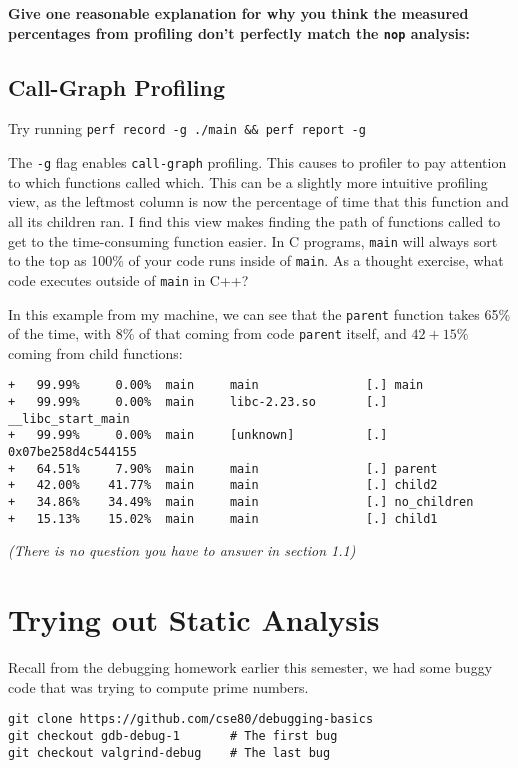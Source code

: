 \documentclass{article}
\begin{document}
\textbf{Give one reasonable explanation for why you think the measured
  percentages from profiling don't perfectly match the \texttt{nop} analysis:}
\vfill


\subsection{Call-Graph Profiling}
Try running \texttt{perf record -g ./main \&\& perf report -g}

The \texttt{-g} flag enables \texttt{call-graph} profiling. This causes to
profiler to pay attention to which functions called which. This can be a
slightly more intuitive profiling view, as the leftmost column is now the
percentage of time that this function and all its children ran. I find this
view makes finding the path of functions called to get to the time-consuming
function easier. In C programs, \texttt{main} will always sort to the top as
100\% of your code runs inside of \texttt{main}. As a thought exercise, what
code executes outside of \texttt{main} in C++?

In this example from my machine, we can see that the \texttt{parent} function
takes 65\% of the time, with 8\% of that coming from code \texttt{parent}
itself, and $42+15$\% coming from child functions:

{\footnotesize
\begin{verbatim}
+   99.99%     0.00%  main     main               [.] main
+   99.99%     0.00%  main     libc-2.23.so       [.] __libc_start_main
+   99.99%     0.00%  main     [unknown]          [.] 0x07be258d4c544155
+   64.51%     7.90%  main     main               [.] parent
+   42.00%    41.77%  main     main               [.] child2
+   34.86%    34.49%  main     main               [.] no_children
+   15.13%    15.02%  main     main               [.] child1
\end{verbatim}
}

\emph{\small
(There is no question you have to answer in section 1.1)
}

\newpage
\section{Trying out Static Analysis}

Recall from the debugging homework earlier this semester, we had some buggy
code that was trying to compute prime numbers.

\begin{verbatim}
git clone https://github.com/cse80/debugging-basics
git checkout gdb-debug-1       # The first bug
git checkout valgrind-debug    # The last bug
\end{verbatim}
\end{document}

